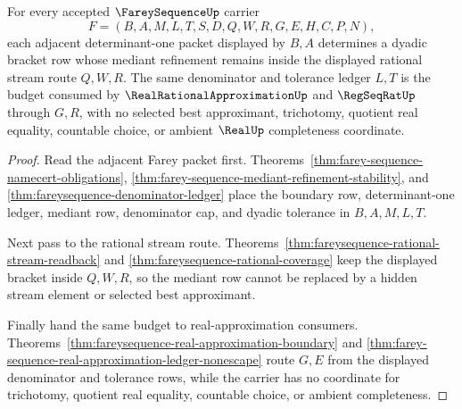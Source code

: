 \begin{theorem}
\label{thm:fareysequence-dyadic-mediant-bracket}
For every accepted $\FareySequenceUp$ carrier
$$
F=(B,A,M,L,T,S,D,Q,W,R,G,E,H,C,P,N),
$$
each adjacent determinant-one packet displayed by $B,A$ determines a dyadic bracket row whose mediant refinement remains inside the displayed rational stream route $Q,W,R$. The same denominator and tolerance ledger $L,T$ is the budget consumed by $\RealRationalApproximationUp$ and $\RegSeqRatUp$ through $G,R$, with no selected best approximant, trichotomy, quotient real equality, countable choice, or ambient $\RealUp$ completeness coordinate.
\end{theorem}
\begin{proof}
Read the adjacent Farey packet first. Theorems~\ref{thm:farey-sequence-namecert-obligations}, \ref{thm:farey-sequence-mediant-refinement-stability}, and \ref{thm:fareysequence-denominator-ledger} place the boundary row, determinant-one ledger, mediant row, denominator cap, and dyadic tolerance in $B,A,M,L,T$.

Next pass to the rational stream route. Theorems~\ref{thm:fareysequence-rational-stream-readback} and \ref{thm:fareysequence-rational-coverage} keep the displayed bracket inside $Q,W,R$, so the mediant row cannot be replaced by a hidden stream element or selected best approximant.

Finally hand the same budget to real-approximation consumers. Theorems~\ref{thm:fareysequence-real-approximation-boundary} and \ref{thm:farey-sequence-real-approximation-ledger-nonescape} route $G,E$ from the displayed denominator and tolerance rows, while the carrier has no coordinate for trichotomy, quotient real equality, countable choice, or ambient completeness.
\end{proof}

